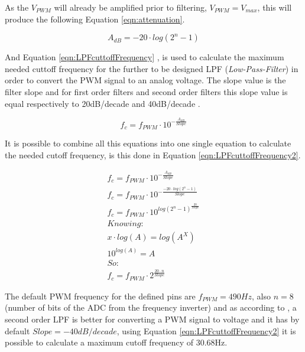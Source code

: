		As the $V_{PWM}$ will already be amplified prior to filtering, $V_{PWM}=V_{max}$, this will produce the following Equation \ref{eqn:attenuation}.
		
			\begin{equation}\label{eqn:attenuation}
				A_{dB}=-20 \cdot log \left( 2^n - 1\right) 
			\end{equation}
	
		And Equation \ref{eqn:LPFcuttoffFrequency} \cite{metivier2013pwm}, is used to calculate the maximum needed cuttoff frequency for the further to be designed LPF (\textit{Low-Pass-Filter}) in order to convert the PWM signal to an analog voltage. The slope value is the filter slope and for first order filters and second order filters this slope value is equal respectively to 20dB/decade and 40dB/decade \cite{metivier2013pwm}.
	
			\begin{equation}\label{eqn:LPFcuttoffFrequency}
				f_{c}=f_{PWM} \cdot 10^{-\frac{A_{dB}}{Slope}}
			\end{equation}

		It is possible to combine all this equations into one single equation to calculate the needed cutoff frequency, is this done in Equation \ref{eqn:LPFcuttoffFrequency2}.

			\begin{equation}\label{eqn:LPFcuttoffFrequency2}
				\begin{split}
					f_{c}=f_{PWM} \cdot 10^{-\frac{A_{dB}}{Slope}}	\\
					f_{c}=f_{PWM} \cdot 10^{-\frac{-20 \cdot log \left( 2^n - 1\right)}{Slope}}	\\
					f_{c}=f_{PWM} \cdot 10^{log \left( 2^n - 1 \right)^\frac{20}{Slope}}	\\
					Knowing:	\\
					x \cdot log \left( A \right) =  log \left( A^{X} \right) \\
					10^{log \left( A \right) } = A	\\
					So:	\\
					f_{c}=f_{PWM} \cdot  2^{\frac{20 \cdot n}{Slope}}
				\end{split}
			\end{equation}

	
		The default PWM frequency for the defined pins are $f_{PWM}=490Hz$, also $n=8$ (number of bits of the ADC from the frequency inverter) and as according to \cite{metivier2013pwm}, a second order LPF is better for converting a PWM signal to voltage and it has by default $Slope=-40dB/decade$, using Equation \ref{eqn:LPFcuttoffFrequency2} it is possible to calculate a maximum cutoff frequency of 30.68Hz. 

